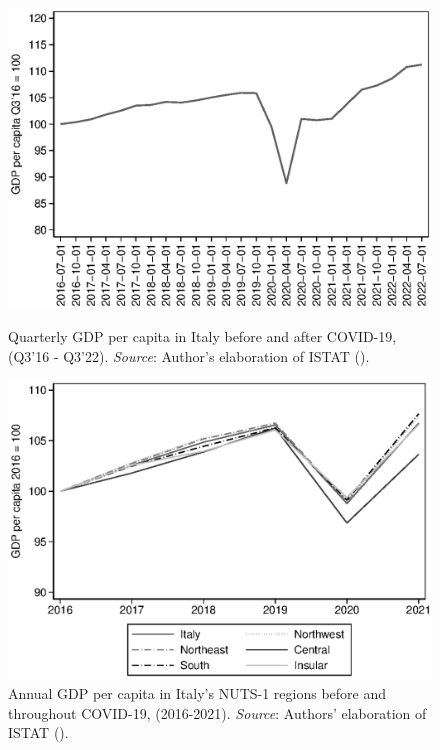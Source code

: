 \documentclass[12pt]{article}
\begin{document}
\begin{figure}
    \centering
    \begin{minipage}[t]{.5\textwidth}
    \centering
    \includegraphics[width=\textwidth]{ita_gdpq.eps}
    \caption{Quarterly GDP per capita in Italy before and after COVID-19, (Q3'16 - Q3'22). \textit{Source}: Author's elaboration of ISTAT (\citeyear{istat}).}
    \label{fig:GDPita}
    \end{minipage}\hfill
    \begin{minipage}[t]{.5\textwidth}
    \centering
    \includegraphics[width=\textwidth]{n1_gdpy}
    \caption{Annual GDP per capita in Italy's NUTS-1 regions before and throughout COVID-19, (2016-2021). \textit{Source}: Authors’ elaboration of ISTAT (\citeyear{istat}).}
    \label{fig:GDPN1}
    \end{minipage}
\end{figure}
\end{document}
